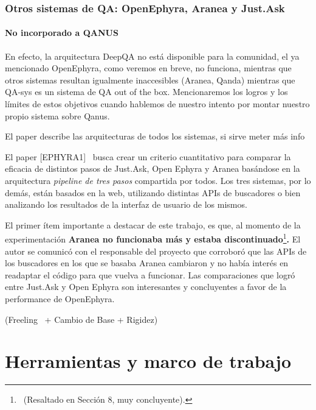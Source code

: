 \bigskip


\subsection{Otros sistemas de QA: OpenEphyra, Aranea y Just.Ask}
\label{subsec:otros-sistemas}
\bigskip

\subsubsection{No incorporado a QANUS}
En efecto, la arquitectura DeepQA no está disponible para la comunidad, el ya mencionado OpenEphyra, como veremos en breve, no funciona, mientras que otros sistemas resultan igualmente inaccesibles (Aranea, Qanda) mientras que QA-sys es un sistema de QA out of the box. Mencionaremos los logros y los límites de estos objetivos cuando hablemos de nuestro intento por montar nuestro propio sistema sobre Qanus. 

\bigskip


El paper describe las arquitecturas de todos los sistemas, si sirve
meter más info

El paper [EPHYRA1] \ busca crear un criterio cuantitativo para comparar
la eficacia de distintos pasos de Just.Ask, Open Ephyra y Aranea
basándose en la arquitectura \textit{pipeline de tres pasos}
compartida por todos. Los tres sistemas, por lo demás, están
basados en la web, utilizando distintas APIs de buscadores o bien
analizando los resultados de la interfaz de usuario de los mismos. 

El primer ítem importante a destacar de este trabajo, es que, al
momento de la experimentación \textbf{Aranea no funcionaba más y
estaba discontinuado}\footnote{\ (Resaltado en Sección 8, muy
concluyente).\par }\textbf{. }El autor se comunicó con el responsable
del proyecto que corroboró que las APIs de los buscadores en los que
se basaba Aranea cambiaron y no había interés en readaptar el
código para que vuelva a funcionar. Las comparaciones que logró
entre Just.Ask y Open Ephyra son interesantes y concluyentes a favor de
la performance de OpenEphyra. 

(Freeling \ + Cambio de Base + Rigidez)





\chapter{Herramientas y marco de trabajo}

